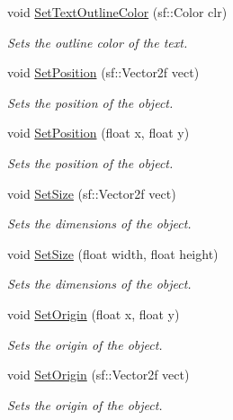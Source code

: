 \begin{DoxyCompactItemize}
void \mbox{\hyperlink{class_game_objects_1_1_button_afa9aeb9d1538547a455a2388259ec928}{Set\+Text\+Outline\+Color}} (sf\+::\+Color clr)
\begin{DoxyCompactList}\small\item\em Sets the outline color of the text. \end{DoxyCompactList}\item 
void \mbox{\hyperlink{class_game_objects_1_1_button_a72088e5bd0e281c879587b24e267f12f}{Set\+Position}} (sf\+::\+Vector2f vect)
\begin{DoxyCompactList}\small\item\em Sets the position of the object. \end{DoxyCompactList}\item 
void \mbox{\hyperlink{class_game_objects_1_1_button_acd7702c79e4eb9d340f25db686e67102}{Set\+Position}} (float x, float y)
\begin{DoxyCompactList}\small\item\em Sets the position of the object. \end{DoxyCompactList}\item 
void \mbox{\hyperlink{class_game_objects_1_1_button_a0a7324d60360eb565116261171aaf6ba}{Set\+Size}} (sf\+::\+Vector2f vect)
\begin{DoxyCompactList}\small\item\em Sets the dimensions of the object. \end{DoxyCompactList}\item 
void \mbox{\hyperlink{class_game_objects_1_1_button_ad5379c5d7415a8bdfc27826e06024dcb}{Set\+Size}} (float width, float height)
\begin{DoxyCompactList}\small\item\em Sets the dimensions of the object. \end{DoxyCompactList}\item 
void \mbox{\hyperlink{class_game_objects_1_1_button_a3404fcd2a6347a8700557ae204f316fc}{Set\+Origin}} (float x, float y)
\begin{DoxyCompactList}\small\item\em Sets the origin of the object. \end{DoxyCompactList}\item 
void \mbox{\hyperlink{class_game_objects_1_1_button_acbcba8110b0bbe64ebb48a7f54018f14}{Set\+Origin}} (sf\+::\+Vector2f vect)
\begin{DoxyCompactList}\small\item\em Sets the origin of the object. \end{DoxyCompactList}\item 

\end{DoxyCompactItemize}
